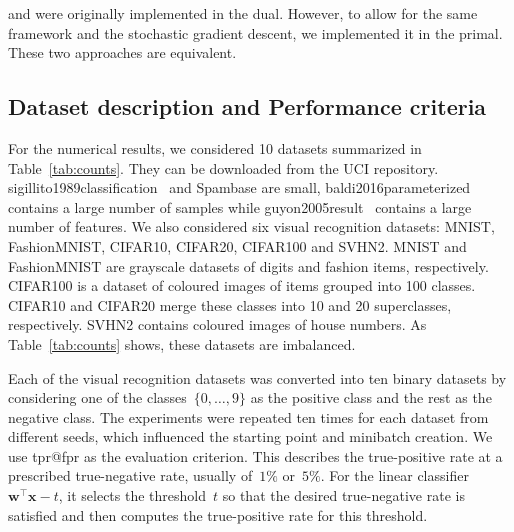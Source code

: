 \TopPush and \tauFPL were originally implemented in the dual. However, to allow for the same framework and the stochastic gradient descent, we implemented it in the primal. These two approaches are equivalent.

\subsection{Dataset description and Performance criteria}\label{sec:datasets}

For the numerical results, we considered 10 datasets summarized in Table~\ref{tab:counts}. They can be downloaded from the UCI repository. sigillito1989classification~\cite{sigillito1989classification} and Spambase are small, baldi2016parameterized~\cite{baldi2016parameterized} contains a large number of samples while guyon2005result~\cite{guyon2005result} contains a large number of features. We also considered six visual recognition datasets: MNIST, FashionMNIST, CIFAR10, CIFAR20, CIFAR100 and SVHN2. MNIST and FashionMNIST are grayscale datasets of digits and fashion items, respectively. CIFAR100 is a dataset of coloured images of items grouped into 100 classes. CIFAR10 and CIFAR20 merge these classes into 10 and 20 superclasses, respectively. SVHN2 contains coloured images of house numbers. As Table~\ref{tab:counts} shows, these datasets are imbalanced.

Each of the visual recognition datasets was converted into ten binary datasets by considering one of the classes~$\{0,\dots,9\}$ as the positive class and the rest as the negative class. The experiments were repeated ten times for each dataset from different seeds, which influenced the starting point and minibatch creation. We use tpr@fpr as the evaluation criterion. This describes the true-positive rate at a prescribed true-negative rate, usually of~$1\%$ or~$5\%$. For the linear classifier~$\bm{w}^\top \bm{x} - t$, it selects the threshold~$t$ so that the desired true-negative rate is satisfied and then computes the true-positive rate for this threshold.

